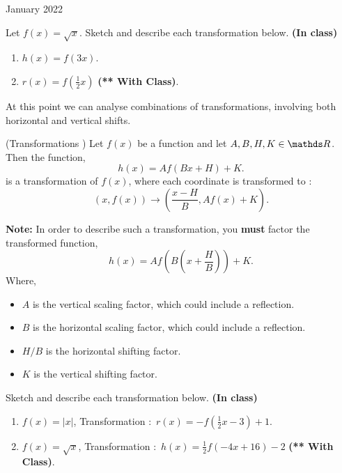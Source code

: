 \documentclass[12pt,oneside]{book} %
\begin{document}
\begin{lec}{January 2022}
  \newpage

  \begin{ex}
    Let $f(x) = \sqrt{x}$. Sketch and describe each transformation below. \textbf{(In class)}
    \begin{enumerate}[label=(\alph*)]
      \item $h(x) = f(3x)$.
      \item $r(x) = f(\frac{1}{2}x)$ \hfill \textbf{(** With Class)}.
    \end{enumerate}
  \end{ex}

  At this point we can analyse combinations of transformations, involving both horizontal and vertical shifts.

  \begin{thrm}
    (Transformations \cite{col-alg}) Let $f(x)$ be a function and let $A,B,H,K \in \R$. Then the function,
    \[
        h(x) = Af (Bx + H) + K
    .\] 
    is a transformation of $f(x)$, where each coordinate is transformed to :
    \[
          (x,f(x)) \longrightarrow \left(\frac{x-H}{B}, Af(x) + K\right)
    .\] 
  \end{thrm}

  \textbf{Note:} In order to describe such a transformation, you \textbf{must} factor the transformed function,
  \[
        h(x) = Af \left(B\left( x + \frac{H}{B} \right) \right) + K
  .\] 
  Where,
  \begin{itemize}
    \item $A$ is the vertical scaling factor, which could include a reflection.
    \item $B$ is the horizontal scaling factor, which could include a reflection.
    \item $H / B$ is the horizontal shifting factor.
    \item $K$ is the vertical shifting factor.
  \end{itemize}

  \begin{ex}
    Sketch and describe each transformation below. \textbf{(In class)}
    \begin{enumerate}[label=(\alph*)]
      \item $f(x) = \left|x\right|$, Transformation $\colon$ $r(x) = -f\left(\frac{1}{2}x - 3\right) + 1$.
      \item $f(x) = \sqrt{x}$, Transformation $\colon$ $h(x) = \frac{1}{2}f(-4x + 16) - 2$ \hfill \textbf{(** With Class)}.
    \end{enumerate}
  \end{ex}




	\end{lec}


\end{document}
